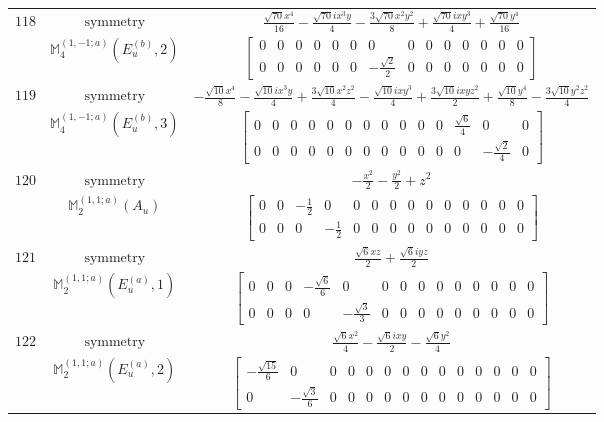 \documentclass[fleqn,8pt,landscape]{jsarticle}
\begin{document}
\begin{longtable}{ccc}
$ 118 $ & $ \text{symmetry} $ & $ \frac{\sqrt{70} x^{4}}{16} - \frac{\sqrt{70} i x^{3} y}{4} - \frac{3 \sqrt{70} x^{2} y^{2}}{8} + \frac{\sqrt{70} i x y^{3}}{4} + \frac{\sqrt{70} y^{4}}{16} $ \\
$  $ & $ \mathbb{M}_{4}^{(1,-1;a)}(E_{u}^{(b)},2) $ & $ \begin{bmatrix} 0 & 0 & 0 & 0 & 0 & 0 & 0 & 0 & 0 & 0 & 0 & 0 & 0 & 0 \\ 0 & 0 & 0 & 0 & 0 & 0 & - \frac{\sqrt{2}}{2} & 0 & 0 & 0 & 0 & 0 & 0 & 0 \end{bmatrix} $ \\ \hline
$ 119 $ & $ \text{symmetry} $ & $ - \frac{\sqrt{10} x^{4}}{8} - \frac{\sqrt{10} i x^{3} y}{4} + \frac{3 \sqrt{10} x^{2} z^{2}}{4} - \frac{\sqrt{10} i x y^{3}}{4} + \frac{3 \sqrt{10} i x y z^{2}}{2} + \frac{\sqrt{10} y^{4}}{8} - \frac{3 \sqrt{10} y^{2} z^{2}}{4} $ \\
$  $ & $ \mathbb{M}_{4}^{(1,-1;a)}(E_{u}^{(b)},3) $ & $ \begin{bmatrix} 0 & 0 & 0 & 0 & 0 & 0 & 0 & 0 & 0 & 0 & 0 & \frac{\sqrt{6}}{4} & 0 & 0 \\ 0 & 0 & 0 & 0 & 0 & 0 & 0 & 0 & 0 & 0 & 0 & 0 & - \frac{\sqrt{2}}{4} & 0 \end{bmatrix} $ \\ \hline
$ 120 $ & $ \text{symmetry} $ & $ - \frac{x^{2}}{2} - \frac{y^{2}}{2} + z^{2} $ \\
$  $ & $ \mathbb{M}_{2}^{(1,1;a)}(A_{u}) $ & $ \begin{bmatrix} 0 & 0 & - \frac{1}{2} & 0 & 0 & 0 & 0 & 0 & 0 & 0 & 0 & 0 & 0 & 0 \\ 0 & 0 & 0 & - \frac{1}{2} & 0 & 0 & 0 & 0 & 0 & 0 & 0 & 0 & 0 & 0 \end{bmatrix} $ \\ \hline
$ 121 $ & $ \text{symmetry} $ & $ \frac{\sqrt{6} x z}{2} + \frac{\sqrt{6} i y z}{2} $ \\
$  $ & $ \mathbb{M}_{2}^{(1,1;a)}(E_{u}^{(a)},1) $ & $ \begin{bmatrix} 0 & 0 & 0 & - \frac{\sqrt{6}}{6} & 0 & 0 & 0 & 0 & 0 & 0 & 0 & 0 & 0 & 0 \\ 0 & 0 & 0 & 0 & - \frac{\sqrt{3}}{3} & 0 & 0 & 0 & 0 & 0 & 0 & 0 & 0 & 0 \end{bmatrix} $ \\ \hline
$ 122 $ & $ \text{symmetry} $ & $ \frac{\sqrt{6} x^{2}}{4} - \frac{\sqrt{6} i x y}{2} - \frac{\sqrt{6} y^{2}}{4} $ \\
$  $ & $ \mathbb{M}_{2}^{(1,1;a)}(E_{u}^{(a)},2) $ & $ \begin{bmatrix} - \frac{\sqrt{15}}{6} & 0 & 0 & 0 & 0 & 0 & 0 & 0 & 0 & 0 & 0 & 0 & 0 & 0 \\ 0 & - \frac{\sqrt{3}}{6} & 0 & 0 & 0 & 0 & 0 & 0 & 0 & 0 & 0 & 0 & 0 & 0 \end{bmatrix} $ \\ \hline

\end{longtable}
\end{document}
